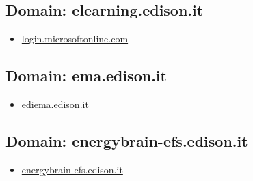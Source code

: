 \documentclass{article}
\begin{document}
    \subsection{Domain: elearning.edison.it}
    \begin{itemize}
        
            
                
                \item \href{ https://login.microsoftonline.com/13088d93-50a5-4881-b6f2-ef681814a814/saml2?SAMLRequest=jVJha9swEP0rRt9lW3ac2CIJZAtjgXYLTdoP\%2BzLO8rkR2JKnk8v276fYLe1gKxMciLt77909bk3Qd4Pcjf5i7vDHiOSjn31nSE6FDRudkRZIkzTQI0mv5Gl3eyOzOJWDs94q27E3kPcRQITOa2tYdNhv2HfElSorBUWeF2pRh9fmqERRLesaFEBVrVSbihaQRQ\%2FoKCA3LBAFONGIB0MejA\%2BpNMu5SHm2PItMLlayyL6xaB\%2B20Qb8hLp4P5BMks4\%2BahP3WjlLtvXWdNpgrGyfiDwty6bKeZFCwRdlKXi9bDOO7bIUpVhAiOS6Y8ai3csiH62hsUd3QvekFd7f3bxKYYfgjDaPMTaarIm1TyA4PZMkNMwfDori4TL8rZ9Fx2eTP2jThNL7\%2FtZzE8nP5\%2FORH7\%2Bezmy7vorIyS\%2B3\%2Ff\%2FRevTQgIfrZOvkLcd6vpkvQf2wP9pOq1\%2FRJ\%2Bt68P8eTsRiyuiGt1OrHA0NqHSrsWHJdlb48xC3vwE\%3D\&RelayState=https\%3A\%2F\%2Felearning.edison.it\%2F\&SigAlg=http\%3A\%2F\%2Fwww.w3.org\%2F2001\%2F04\%2Fxmldsig-more\%23rsa-sha256\&Signature=ip4xo1hUfJvZwPDR6ohdEQfpRou\%2BM3oXmsyrVnRpkXa5BG38exNCe7y\%2BGuLBHSAYHrgUrqkLeoSIZVqdBk1\%2Fzgpc6Wsep1RefWRvXKprHQnioafBRF78TEQ\%2FmPmacwSTOs1mE1OhGWRszsfW\%2F6LS\%2F\%2FL2m29BJCuLPPVpjVu\%2BhJujDSN3DDivxoEzozTB4nFnvKuHfuqjrQdISPguSciZmi2pUPB\%2FShkOdydjZm7BWvP43M9w5STrIN8E3\%2B28OhUGmc5zyse6iH2SUnTBE11Ls7IfRzvYwG9zQKbWYQ7HHY8FxjrqQ4Z2N\%2BtLu62DQ\%2FWEpPTdBN26wnFT\%2BbqoIbYyDw\%3D\%3D\&sso\_reload=true}{ login.microsoftonline.com }
            
        
    \end{itemize}

    \subsection{Domain: ema.edison.it}
    \begin{itemize}
        
            
                
                \item \href{ http://ediema.edison.it/}{ ediema.edison.it }
            
        
    \end{itemize}

    \subsection{Domain: energybrain-efs.edison.it}
    \begin{itemize}
        
            
                
                \item \href{ http://energybrain-efs.edison.it/}{ energybrain-efs.edison.it }
            
        
    \end{itemize}
\end{document}
